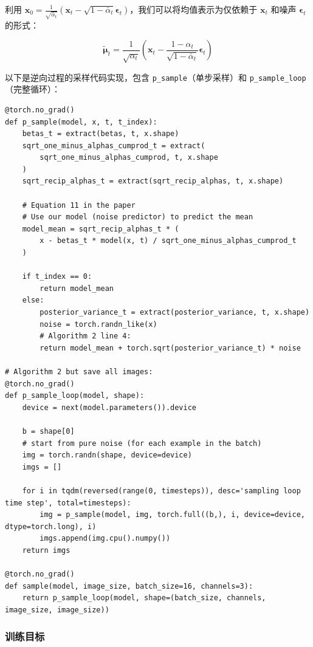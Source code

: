 \documentclass[zihao=-4, fontset=windows]{ctexart}
\begin{document}
利用 $\mathbf{x}_{0} = \frac{1}{\sqrt{\bar{\alpha}_{t}}}(\mathbf{x}_{t}-\sqrt{1-\bar{\alpha}_{t}} \boldsymbol{\epsilon}_{t})$，我们可以将均值表示为仅依赖于 $\mathbf{x}_t$ 和噪声 $\boldsymbol{\epsilon}_t$ 的形式：

\begin{equation}
\tilde{\boldsymbol{\mu}}_{t} = \frac{1}{\sqrt{\alpha_{t}}}\left(\mathbf{x}_{t}-\frac{1-\alpha_{t}}{\sqrt{1-\bar{\alpha}_{t}}} \boldsymbol{\epsilon}_{t}\right)
\end{equation}

以下是逆向过程的采样代码实现，包含 \texttt{p_sample}（单步采样）和 \texttt{p_sample_loop}（完整循环）：

\begin{verbatim}
@torch.no_grad()
def p_sample(model, x, t, t_index):
    betas_t = extract(betas, t, x.shape)
    sqrt_one_minus_alphas_cumprod_t = extract(
        sqrt_one_minus_alphas_cumprod, t, x.shape
    )
    sqrt_recip_alphas_t = extract(sqrt_recip_alphas, t, x.shape)

    # Equation 11 in the paper
    # Use our model (noise predictor) to predict the mean
    model_mean = sqrt_recip_alphas_t * (
        x - betas_t * model(x, t) / sqrt_one_minus_alphas_cumprod_t
    )

    if t_index == 0:
        return model_mean
    else:
        posterior_variance_t = extract(posterior_variance, t, x.shape)
        noise = torch.randn_like(x)
        # Algorithm 2 line 4:
        return model_mean + torch.sqrt(posterior_variance_t) * noise

# Algorithm 2 but save all images:
@torch.no_grad()
def p_sample_loop(model, shape):
    device = next(model.parameters()).device

    b = shape[0]
    # start from pure noise (for each example in the batch)
    img = torch.randn(shape, device=device)
    imgs = []

    for i in tqdm(reversed(range(0, timesteps)), desc='sampling loop time step', total=timesteps):
        img = p_sample(model, img, torch.full((b,), i, device=device, dtype=torch.long), i)
        imgs.append(img.cpu().numpy())
    return imgs

@torch.no_grad()
def sample(model, image_size, batch_size=16, channels=3):
    return p_sample_loop(model, shape=(batch_size, channels, image_size, image_size))
\end{verbatim}

\subsubsection{训练目标}
\end{document}
